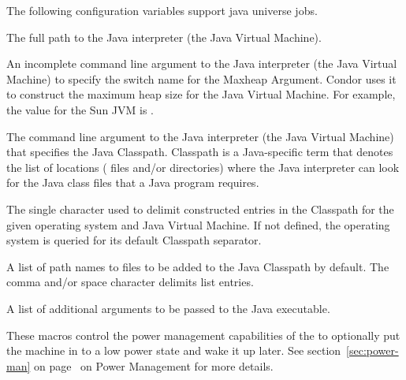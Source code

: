The following configuration variables support java universe jobs.

\begin{description}
\label{param:Java}
\item[\Macro{JAVA}]
  The full path to the Java interpreter (the Java Virtual Machine).

\label{param:JavaMaxheapArgument}
\item[\Macro{JAVA\_MAXHEAP\_ARGUMENT}]
  An incomplete command line argument to the Java interpreter
  (the Java Virtual Machine)
  to specify the switch name for the Maxheap Argument.
  Condor uses it to construct the maximum heap size
  for the Java Virtual Machine. 
  For example, the value for the Sun JVM is .

\label{param:JavaClasspathArgument}
\item[\Macro{JAVA\_CLASSPATH\_ARGUMENT}]
  The command line argument to the Java interpreter (the Java Virtual Machine)
  that specifies the Java Classpath.
  Classpath is a Java-specific term that denotes the list of
  locations ( files and/or directories)
  where the Java interpreter can
  look for the Java class files that a Java program requires.

\label{param:JavaClasspathSeparator}
\item[\Macro{JAVA\_CLASSPATH\_SEPARATOR}]
  The single character used to delimit constructed entries in the
  Classpath for the given operating system and Java Virtual Machine.
  If not defined, the operating system is queried for its default
  Classpath separator.

\label{param:JavaClasspathDefault}
\item[\Macro{JAVA\_CLASSPATH\_DEFAULT}]
  A list of path names to  files to be added to the Java Classpath 
  by default.
  The comma and/or space character delimits list entries.

\label{param:JavaExtraArguments}
\item[\Macro{JAVA\_EXTRA\_ARGUMENTS}]
  A list of additional arguments to be passed to the Java executable.
\end{description}

These macros control the power management capabilities of the 
 to optionally put the machine in to a low power state
and wake it up later.
See section~\ref{sec:power-man} on page~\pageref{sec:power-man} on
Power Management for more details.

